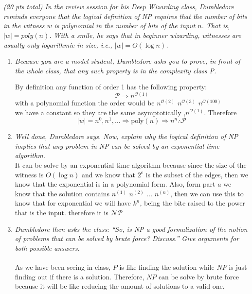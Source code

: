 \documentclass[12pt]{article} \setlength{\oddsidemargin}{0in}
\begin{document}
\section{} %
\textit{(20 pts total) In the review session for his Deep Wizarding class, Dumbledore reminds everyone that the logical definition of NP requires that the number of bits in the witness $w$ is polynomial in the number of bits of the input $n$. That is, $|w| = poly(n)$. With a smile, he says that in beginner wizarding, witnesses are usually only logarithmic in size, i.e., $|w| = O(\log n)$.}
\begin{enumerate}
\item\textit{Because you are a model student, Dumbledore asks you to prove, in front of the whole class, that any such property is in the complexity class P.}

By definition any function of order 1 has the following property: 
$$
\mathcal{P} \Rightarrow n^{\mathcal{O}{\left( 1 \right)}}
$$
with a polynomial function the order would be $ n^{\mathcal{O}{\left( 2 \right)}}$  $ n^{\mathcal{O}{\left( 3 \right)}}$   $n^{\mathcal{O}{\left( 100 \right)}}$ \\
we have a constant so they are the same asymptotically ,$n^{\mathcal{O}{\left( 1 \right)}}$.
Therefore 
$$
|w| = n^0 , n^1,\ldots \Longrightarrow \text{poly}\left( n \right) \Longrightarrow n^n \therefore \mathcal{P}
$$
\item\textit{Well done, Dumbledore says. Now, explain why the logical definition of NP implies that any problem in NP can be solved by an exponential time algorithm.}\\

It can be solve by an exponential time algorithm because since the size of the witness is $O(\log n)$ and we know that $2^e$ is the subset of the edges, then we know that the exponential is in a polynomial form. Also, form part $a$ we know that the solution contains $ n^{\left( 1 \right)}$  $ n^{\left( 2 \right)}$ ...  $n^{\left( n \right)}$, then we can use this to know that for exponential we will have $k^n$, being the bite raised to the power that is the input. therefore it is $\mathcal{N}\mathcal{P}$  

 
\item\textit{Dumbledore then asks the class: ``So, is NP a good formalization of the notion of problems that can be solved by brute force? Discuss.'' Give arguments for both possible answers.} \\\\
As we have been seeing in class, $P$ is like finding the solution while $NP$ is just finding out if there is a solution. Therefore, $NP$ can be solve by brute force because it will be like reducing the amount of solutions to a valid one. 

\end{enumerate}
\end{document}

